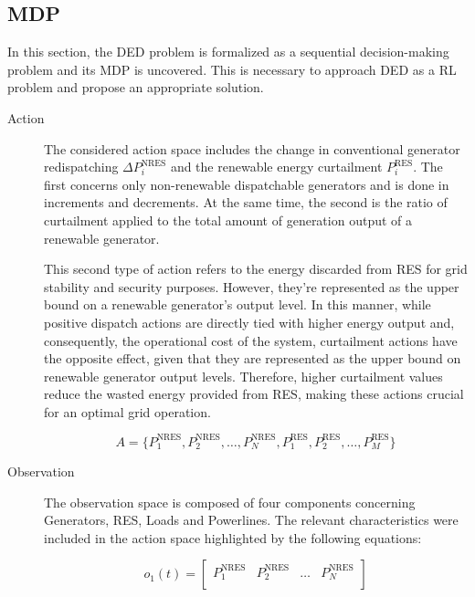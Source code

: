 \subsection{\acf{MDP}}

In this section, the \ac{DED} problem is formalized as a sequential decision-making problem and its \ac{MDP} is uncovered. This is necessary to approach \ac{DED} as a \ac{RL} problem and propose an appropriate solution. 

\begin{description}
	\item[Action] The considered action space includes the change in conventional generator redispatching $\Delta P^\text{NRES}_i$ and the renewable energy curtailment $P^\text{RES}_i$. The first concerns only non-renewable dispatchable generators and is done in increments and decrements. At the same time, the second is the ratio of curtailment applied to the total amount of generation output of a renewable generator. \par
	This second type of action refers to the energy discarded from \ac{RES} for grid stability and security purposes. However, they're represented as the upper bound on a renewable generator's output level. In this manner, while positive dispatch actions are directly tied with higher energy output and, consequently, the operational cost of the system, curtailment actions have the opposite effect, given that they are represented as the upper bound on renewable generator output levels. Therefore, higher curtailment values reduce the wasted energy provided from \ac{RES}, making these actions crucial for an optimal grid operation.
	
	\begin{equation} \label{eq:action-space}
		A = \{P^\text{NRES}_1, P^\text{NRES}_2, \dots, P^\text{NRES}_N, P^\text{RES}_1, P^\text{RES}_2, \dots, P^\text{RES}_M\}
	\end{equation}
	
	\item[Observation] The observation space is composed of four components concerning Generators, \ac{RES}, Loads and Powerlines. The relevant characteristics were included in the action space highlighted by the following equations:
	
	\begin{equation} \label{eq:simple-obs-space1}
		o_{1}(t)= \begin{bmatrix}
			P^\text{NRES}_1 & P^\text{NRES}_2 & \dots & P^\text{NRES}_{N} \\
		\end{bmatrix}
	\end{equation}
	

\end{description}
